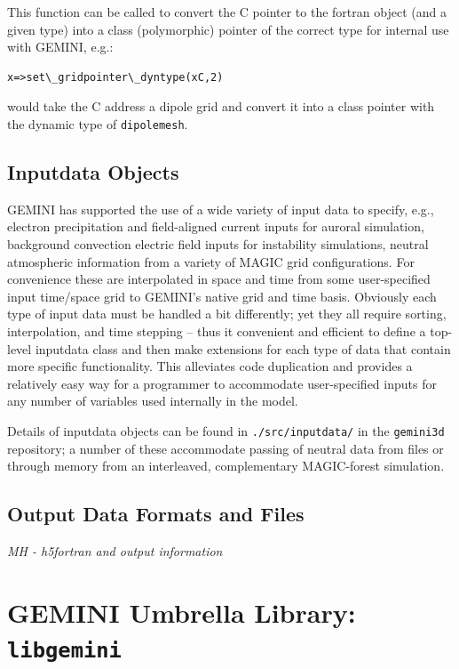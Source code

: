 \documentclass[11pt,letterpaper]{article}
\begin{document}
This function can be called to convert the C pointer to the fortran object (and a given type) into a class (polymorphic) pointer of the correct type for internal use with GEMINI, e.g.:
\begin{verbatim}
x=>set\_gridpointer\_dyntype(xC,2)
 \end{verbatim}
 would take the C address a dipole grid and convert it into a class pointer with the dynamic type of \texttt{dipolemesh}.  


\subsection{Inputdata Objects}

GEMINI has supported the use of a wide variety of input data to specify, e.g., electron precipitation and field-aligned current inputs for auroral simulation, background convection electric field inputs for instability simulations, neutral atmospheric information from a variety of MAGIC grid configurations.  For convenience these are interpolated in space and time from some user-specified input time/space grid to GEMINI's native grid and time basis.  Obviously each type of input data must be handled a bit differently; yet they all require sorting, interpolation, and time stepping -- thus it convenient and efficient to define a top-level inputdata class and then make extensions for each type of data that contain more specific functionality.  This alleviates code duplication and provides a relatively easy way for a programmer to accommodate user-specified inputs for any number of variables used internally in the model.  

Details of inputdata objects can be found in \texttt{./src/inputdata/} in the \texttt{gemini3d} repository; a number of these accommodate passing of neutral data from files or through memory from an interleaved, complementary MAGIC-forest simulation.  


\subsection{Output Data Formats and Files}

\emph{MH - h5fortran and output information}



\section{GEMINI Umbrella Library:  \texttt{libgemini}}
\end{document}
